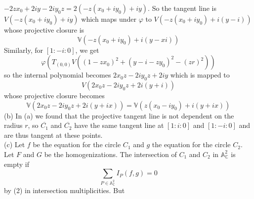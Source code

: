 \documentclass[a4paper]{article}
\begin{document}
      $-2zx_0 + 2iy - 2i y_0 z
      = 2 \left( -z \left( x_0 + iy_0 \right) + iy \right) $. So the tangent
      line is
      $V\left( -z(x_0 +iy_0) + iy \right) $ which maps under $\varphi$ to
      $V\left( -z (x_0 + iy_0) + i(y-i) \right) $ whose projective closure is
      \[
      \mathbb{V} \left( -z (x_0 +iy_0) + i(y-xi) \right) 
      \] 
      Similarly, for $\left[ 1 : -i : 0 \right] $, we get
      \[
      \varphi \left( T_{(0,0)}
      V \left( (1-zx_0)^2 + (y-i-zy_0)^2 - (zr)^2 \right) \right) 
      \] 
      so the internal polynomial becomes 
      $2x_0 z-2iy_0z +2iy$ which is mapped to
      \[
      V\left( 2x_0 z - 2iy_0 z + 2i (y+i) \right) 
      \] 
      whose projective closure becomes
      \[
      \mathbb{V}\left( 2x_0 z - 2iy_0 z + 2i (y+ix) \right) 
      = \mathbb{V}\left( z (x_0 - iy_0) + i(y+ix) \right) 
      \] 
      (b) In (a) we found that the projective tangent line is not dependent on
      the radius $r$, so $\overline{C_1}$ and $\overline{C_2}$ have the
      same tangent line at $\left[ 1 : i : 0 \right] $ and
      $\left[ 1 : -i : 0 \right] $ and are thus tangent at these points.\\
      \linebreak
      (c) Let
      $f$ be the equation for the circle $C_1$ and
      $g$ the equation for the circle $C_2$. Let
      $F$ and $G$ be the homogenizations. The intersection of $C_1$ and $C_2$ in
      $\mathbb{A}_{\mathbb{C}}^2$ is empty if
      \[
      \sum_{P \in \mathbb{A}_{\mathbb{C}}^2} I_P(f, g) = 0
      \] 
      by (2) in intersection multiplicities. But
      
\end{document}
